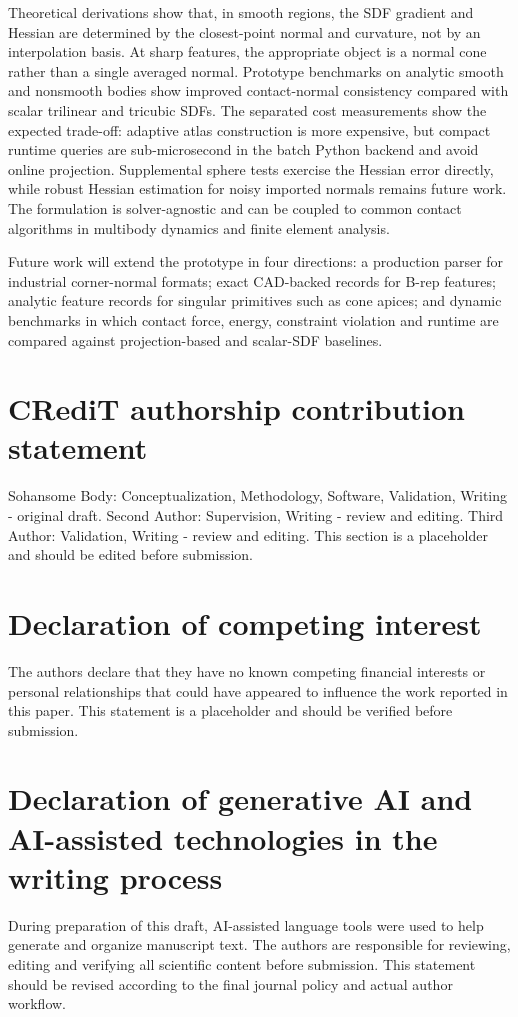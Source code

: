 \documentclass[preprint,12pt,sort&compress]{elsarticle}
\begin{document}
Theoretical derivations show that, in smooth regions, the SDF gradient and Hessian are determined by the closest-point normal and curvature, not by an interpolation basis. At sharp features, the appropriate object is a normal cone rather than a single averaged normal. Prototype benchmarks on analytic smooth and nonsmooth bodies show improved contact-normal consistency compared with scalar trilinear and tricubic SDFs. The separated cost measurements show the expected trade-off: adaptive atlas construction is more expensive, but compact runtime queries are sub-microsecond in the batch Python backend and avoid online projection. Supplemental sphere tests exercise the Hessian error directly, while robust Hessian estimation for noisy imported normals remains future work. The formulation is solver-agnostic and can be coupled to common contact algorithms in multibody dynamics and finite element analysis.

Future work will extend the prototype in four directions: a production parser for industrial corner-normal formats; exact CAD-backed records for B-rep features; analytic feature records for singular primitives such as cone apices; and dynamic benchmarks in which contact force, energy, constraint violation and runtime are compared against projection-based and scalar-SDF baselines.

\section*{CRediT authorship contribution statement}
Sohansome Body: Conceptualization, Methodology, Software, Validation, Writing - original draft. Second Author: Supervision, Writing - review and editing. Third Author: Validation, Writing - review and editing. This section is a placeholder and should be edited before submission.

\section*{Declaration of competing interest}
The authors declare that they have no known competing financial interests or personal relationships that could have appeared to influence the work reported in this paper. This statement is a placeholder and should be verified before submission.

\section*{Declaration of generative AI and AI-assisted technologies in the writing process}
During preparation of this draft, AI-assisted language tools were used to help generate and organize manuscript text. The authors are responsible for reviewing, editing and verifying all scientific content before submission. This statement should be revised according to the final journal policy and actual author workflow.
\end{document}
